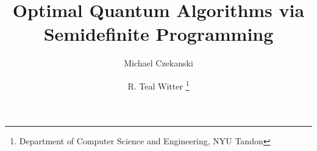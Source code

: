 \documentclass[]{article}
\begin{document}
\newcommand{\todo}[1]{{\color{red}{[{\bf TODO:} #1]}}}

\title{Optimal Quantum Algorithms via Semidefinite Programming}

\author{Michael Czekanski
\and R. Teal Witter
\thanks{Department of Computer Science and Engineering, NYU Tandon}}

\date{}

\maketitle


\graphicspath{{./../figures/}}
\end{document}
